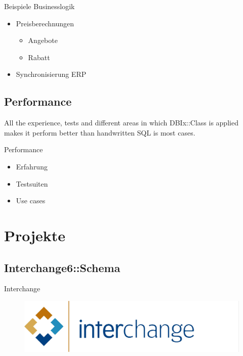 \begin{frame}{Beispiele Businesslogik}
\begin{itemize}
\item Preisberechnungen
\begin{itemize}
\item Angebote
\item Rabatt
\end{itemize}
\item Synchronisierung ERP
\end{itemize}
\end{frame}

\subsection{Performance}

All the experience, tests and different areas in which
DBIx::Class is applied makes it perform better than
handwritten SQL is most cases.

\begin{frame}{Performance}
\begin{itemize}
\item Erfahrung
\item Testsuiten
\item Use cases
\end{itemize}
\end{frame}

\section{Projekte}

\subsection{Interchange6::Schema}

\begin{frame}{Interchange}
\begin{figure}[!ht]
\centering
\includegraphics[width=1\linewidth]{img/interchange.jpg}
\end{figure}
\end{frame}


